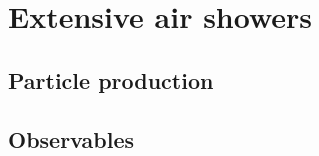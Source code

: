\chapter[Extensive air showers]{Extensive air showers}
\label{sec:showers}


\section{Particle production}


\section{Observables}



